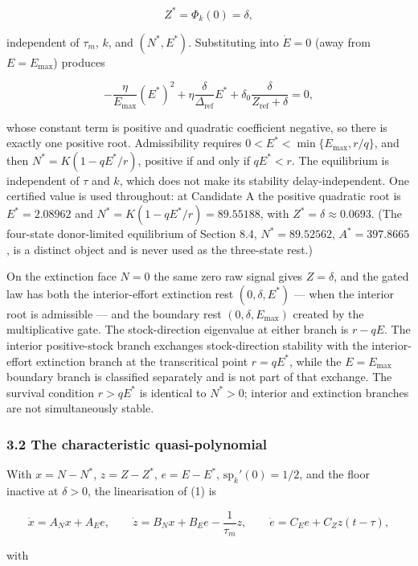 \documentclass[11pt]{article}
\begin{document}
\[Z^* = \Phi_k(0) = \delta,\]

independent of \(\tau_m\), \(k\), and \((N^*, E^*)\). Substituting into
\(\dot E = 0\) (away from \(E = E_{\max}\)) produces

\[-\frac{\eta}{E_{\max}}(E^*)^2 + \eta\frac{\delta}{\Delta_{\mathrm{ref}}}E^* + \delta_0\frac{\delta}{Z_{\mathrm{ref}} + \delta} = 0,\]

whose constant term is positive and quadratic coefficient negative, so
there is exactly one positive root. Admissibility requires
\(0 < E^* < \min\{E_{\max}, r/q\}\), and then \(N^* = K(1 - qE^*/r)\),
positive if and only if \(qE^* < r\). The equilibrium is independent of
\(\tau\) and \(k\), which does not make its stability delay-independent.
One certified value is used throughout: at Candidate A the positive
quadratic root is \(E^* = 2.08962\) and
\(N^* = K(1 - qE^*/r) = 89.55188\), with
\(Z^* = \delta \approx 0.0693\). (The four-state donor-limited
equilibrium of Section 8.4, \(N^* = 89.52562\), \(A^* = 397.8665\), is a
distinct object and is never used as the three-state rest.)

On the extinction face \(N = 0\) the same zero raw signal gives
\(Z = \delta\), and the gated law has both the interior-effort
extinction rest \((0, \delta, E^*)\) --- when the interior root is
admissible --- and the boundary rest \((0, \delta, E_{\max})\) created
by the multiplicative gate. The stock-direction eigenvalue at either
branch is \(r - qE\). The interior positive-stock branch exchanges
stock-direction stability with the interior-effort extinction branch at
the transcritical point \(r = qE^*\), while the \(E = E_{\max}\)
boundary branch is classified separately and is not part of that
exchange. The survival condition \(r > qE^*\) is identical to
\(N^* > 0\); interior and extinction branches are not simultaneously
stable.

\subsubsection{3.2 The characteristic
quasi-polynomial}\label{the-characteristic-quasi-polynomial}

With \(x = N - N^*\), \(z = Z - Z^*\), \(e = E - E^*\),
\(\mathrm{sp}_k'(0) = 1/2\), and the floor inactive at \(\delta > 0\),
the linearisation of (1) is

\[\dot x = A_N x + A_E e, \qquad \dot z = B_N x + B_E e - \frac{1}{\tau_m}z, \qquad \dot e = C_E e + C_Z z(t - \tau),\]

with
\end{document}
